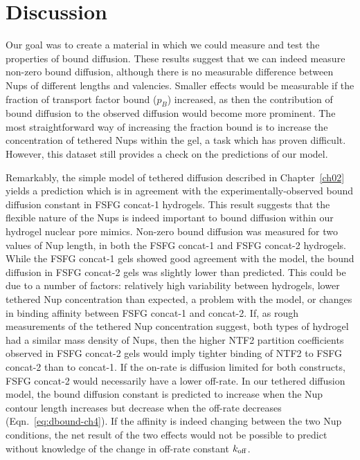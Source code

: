 

\section{Discussion}

Our goal was to create a material in which we could measure and test the properties of bound diffusion.  These results suggest that we can indeed measure non-zero bound diffusion, although there is no measurable difference between Nups of different lengths and valencies.  Smaller effects would be measurable if the fraction of transport factor bound ($p_B$) increased, as then the contribution of bound diffusion to the observed diffusion would become more prominent.  The most straightforward way of increasing the fraction bound is to increase the concentration of tethered Nups within the gel, a task which has proven difficult.  However, this dataset still provides a check on the predictions of our model.

Remarkably, the simple model of tethered diffusion described in Chapter~\ref{ch02} yields a prediction which is in agreement with the experimentally-observed bound diffusion constant in FSFG concat-1 hydrogels.  This result suggests that the flexible nature of the Nups is indeed important to bound diffusion within our hydrogel nuclear pore mimics.  Non-zero bound diffusion was measured for two values of Nup length, in both the FSFG concat-1 and FSFG concat-2 hydrogels.  While the FSFG concat-1 gels showed good agreement with the model, the bound diffusion in FSFG concat-2 gels was slightly lower than predicted.  This could be due to a number of factors: relatively high variability between hydrogels, lower tethered Nup concentration than expected, a problem with the model, or changes in binding affinity between FSFG concat-1 and concat-2.  If, as rough measurements of the tethered Nup concentration suggest, both types of hydrogel had a similar mass density of Nups, then the higher NTF2 partition coefficients observed in FSFG concat-2 gels would imply tighter binding of NTF2 to FSFG concat-2 than to concat-1.  If the on-rate is diffusion limited for both constructs, FSFG concat-2 would necessarily have a lower off-rate.  In our tethered diffusion model, the bound diffusion constant is predicted to increase when the Nup contour length increases but decrease when the off-rate decreases (Eqn.~\ref{eq:dbound-ch4}).  If the affinity is indeed changing between the two Nup conditions, the net result of the two effects would not be possible to predict without knowledge of the change in off-rate constant $k_{\rm off}$.

